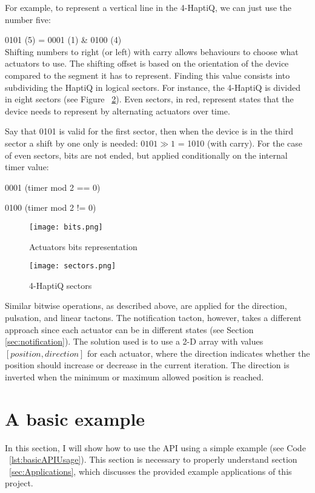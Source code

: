 For example, to represent a vertical line in the 4-HaptiQ, we can just use the number five:

		0101 (5) = 0001 (1) \& 0100 (4) \\
Shifting numbers to right (or left) with carry allows behaviours to choose what actuators to use. 
The shifting offset is based on the orientation of the device compared to the segment it has to represent. Finding this value consists into subdividing the HaptiQ in logical sectors. For instance, the 4-HaptiQ is divided in eight sectors (see Figure ~\ref{fig:sectors}). Even sectors, in red, represent states that the device needs to represent by alternating actuators over time.

Say that 0101 is valid for the first sector, then when the device is in the third sector a shift by one only is needed: $0101 \gg 1$ = 1010 (with carry). For the case of even sectors, bits are not ended, but applied conditionally on the internal timer value:

		0001 (timer mod 2 == 0)
        
        0100 (timer mod 2 != 0)

\begin{figure}[H]
  \centering
  \texttt{[image: bits.png]}
  \caption{Actuators bits representation}
  \label{fig:bits}
\end{figure}

\begin{figure}[H]
  \centering
  \texttt{[image: sectors.png]}
  \caption{4-HaptiQ sectors}
  \label{fig:sectors}
\end{figure}

Similar bitwise operations, as described above, are applied for the direction, pulsation, and linear tactons. The notification tacton, however, takes a different approach since each actuator can be in different states (see Section \ref{sec:notification}). The solution used is to use a 2-D array with values $[position, direction]$ for each actuator, where the direction indicates whether the position should increase or decrease in the current iteration. The direction is inverted when the minimum or maximum allowed position is reached.  

\section{A basic example}

In this section, I will show how to use the API using a simple example (see Code ~\ref{lst:basicAPIUsage}). This section is necessary to properly understand section ~\ref{sec:Applications}, which discusses the provided example applications of this project.

